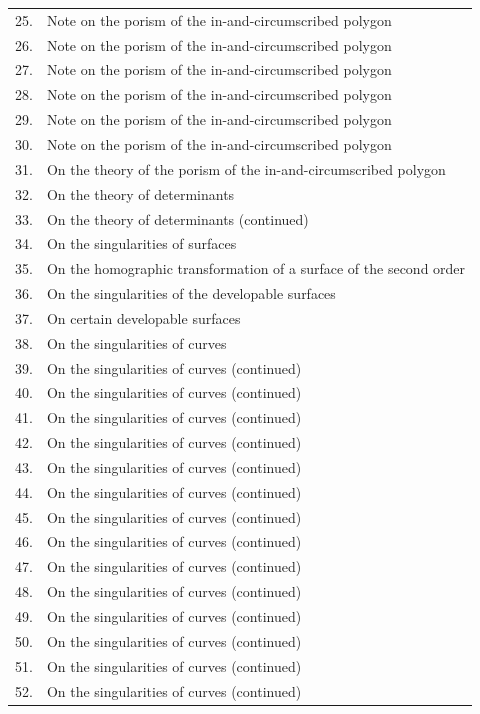 \documentclass[11pt,a4paper]{book}
\begin{document}
\begin{center}
\begin{longtable}{rp{}}
25. & Note on the porism of the in-and-circumscribed polygon \\
26. & Note on the porism of the in-and-circumscribed polygon \\
27. & Note on the porism of the in-and-circumscribed polygon \\
28. & Note on the porism of the in-and-circumscribed polygon \\
29. & Note on the porism of the in-and-circumscribed polygon \\
30. & Note on the porism of the in-and-circumscribed polygon \\
31. & On the theory of the porism of the in-and-circumscribed polygon \\
32. & On the theory of determinants \\
33. & On the theory of determinants (continued) \\
34. & On the singularities of surfaces \\
35. & On the homographic transformation of a surface of the second order \\
36. & On the singularities of the developable surfaces \\
37. & On certain developable surfaces \\
38. & On the singularities of curves \\
39. & On the singularities of curves (continued) \\
40. & On the singularities of curves (continued) \\
41. & On the singularities of curves (continued) \\
42. & On the singularities of curves (continued) \\
43. & On the singularities of curves (continued) \\
44. & On the singularities of curves (continued) \\
45. & On the singularities of curves (continued) \\
46. & On the singularities of curves (continued) \\
47. & On the singularities of curves (continued) \\
48. & On the singularities of curves (continued) \\
49. & On the singularities of curves (continued) \\
50. & On the singularities of curves (continued) \\
51. & On the singularities of curves (continued) \\
52. & On the singularities of curves (continued) \\

\end{longtable}
\end{center}
\end{document}
